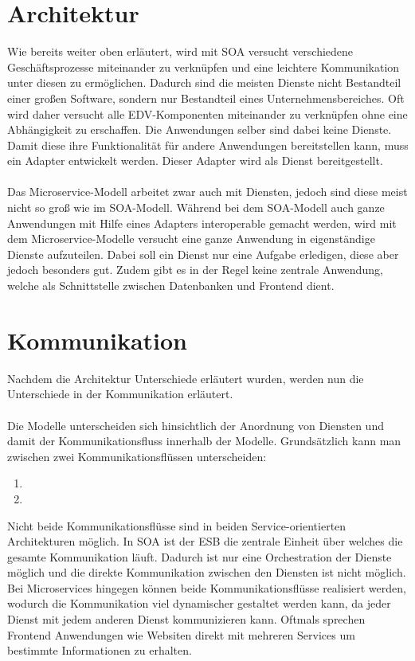 \section{Architektur}
\label{sec:FazitArchitektur}
Wie bereits weiter oben erläutert, wird mit SOA versucht verschiedene Geschäftsprozesse miteinander zu verknüpfen und eine leichtere Kommunikation unter diesen zu ermöglichen. Dadurch sind die meisten Dienste nicht  Bestandteil einer großen Software, sondern nur Bestandteil eines Unternehmensbereiches. Oft wird daher versucht alle EDV-Komponenten miteinander zu verknüpfen ohne eine Abhängigkeit zu erschaffen. Die Anwendungen selber sind dabei keine Dienste. Damit diese ihre Funktionalität für andere Anwendungen bereitstellen kann, muss ein Adapter entwickelt werden. Dieser Adapter wird als Dienst bereitgestellt.
\\\\
Das Microservice-Modell arbeitet zwar auch mit Diensten, jedoch sind diese meist nicht so groß wie im SOA-Modell. Während bei dem SOA-Modell auch ganze Anwendungen mit Hilfe eines Adapters interoperable gemacht werden, wird mit dem Microservice-Modelle versucht eine ganze Anwendung in eigenständige  Dienste aufzuteilen. Dabei soll ein Dienst nur eine Aufgabe erledigen, diese aber jedoch besonders gut. Zudem gibt es in der Regel keine zentrale Anwendung, welche als Schnittstelle zwischen Datenbanken und Frontend dient.

\section{Kommunikation}
\label{sec:FazitKommunikation}
Nachdem die Architektur Unterschiede erläutert wurden, werden nun die Unterschiede in der Kommunikation erläutert.
\\\\
Die Modelle unterscheiden sich hinsichtlich der Anordnung von Diensten und damit der Kommunikationsfluss innerhalb der Modelle. Grundsätzlich kann man zwischen zwei Kommunikationsflüssen unterscheiden:
\begin{enumerate}
    \item {}
    \item {}
\end{enumerate}
Nicht beide Kommunikationsflüsse sind in beiden Service-orientierten Architekturen möglich. In SOA ist der ESB die zentrale Einheit über welches die gesamte Kommunikation läuft. Dadurch ist nur eine Orchestration der Dienste möglich und die direkte Kommunikation  zwischen den Diensten ist nicht möglich. Bei Microservices hingegen können beide Kommunikationsflüsse realisiert werden, wodurch die Kommunikation viel dynamischer gestaltet werden kann, da jeder Dienst mit jedem anderen Dienst kommunizieren kann. Oftmals sprechen Frontend Anwendungen wie Websiten direkt mit mehreren Services um bestimmte Informationen zu erhalten.

